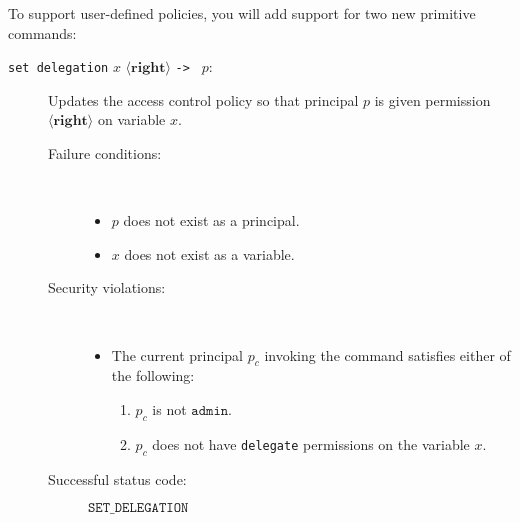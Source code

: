 \documentclass[11pt]{article}
\begin{document}
To support user-defined policies, you will add support for two new primitive commands:
\begin{description}
\item[\texttt{set delegation} $x$ $\langle\mathbf{right}\rangle$ \texttt{->\ } $p$:] Updates the access control policy so that principal $p$ is given permission $\langle\mathbf{right}\rangle$ on variable $x$.
\begin{description}
\item[Failure conditions:]\ \\[-1.5em]
\begin{itemize}
\item $p$ does not exist as a principal.
\item $x$ does not exist as a variable.
\end{itemize}
\item[Security violations:]\ \\[-1.5em]
\begin{itemize}
\item The current principal $p_c$ invoking the command satisfies either of the following:
\begin{enumerate} 
\item $p_c$ is not $\mathtt{admin}$.
\item $p_c$ does not have \texttt{delegate} permissions on the variable $x$.
\end{enumerate}
\end{itemize}
\item[Successful status code:] $\mathtt{SET\_DELEGATION}$
\end{description}


\end{description}
\end{document}
